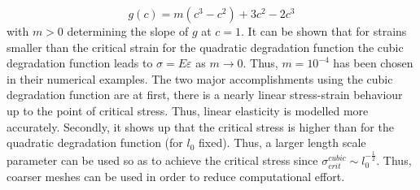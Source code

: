 \begin{equation} \label{eq:cubic_degr_fct}
	g\left(c\right)=m\left(c^{3}-c^{2}\right)+3c^{2}-2c^{3}
\end{equation}
with $m>0$ determining the slope of $g$ at $c=1$. It can be shown that for strains smaller than the critical strain for the quadratic degradation function the cubic degradation function leads to $\sigma=E\varepsilon$ as $m\rightarrow0$. Thus, $m=10^{-4}$ has been chosen in their numerical examples. The two major accomplishments using the cubic degradation function are at first, there is a nearly linear stress-strain behaviour up to the point of critical stress. Thus, linear elasticity is modelled more accurately. Secondly, it shows up that the critical stress is higher than for the quadratic degradation function (for $l_{0}$ fixed). Thus, a larger length scale parameter can be used so as to achieve the critical stress since $\sigma_{crit}^{cubic}\sim l_{0}^{-\frac{1}{2}}$. Thus, coarser meshes can be used in order to reduce computational effort.

